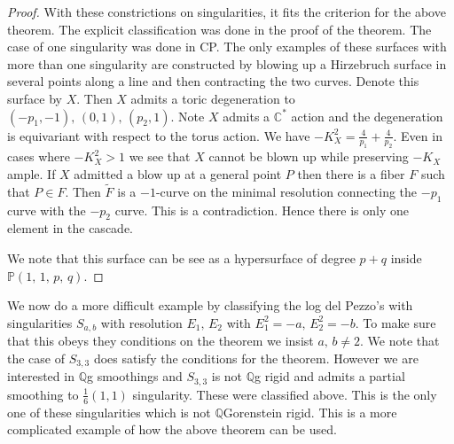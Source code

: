 \documentclass[11pt]{amsbook}
\theoremstyle{plain}
\newcommand{\ldp}{log del Pezzo}
\newcommand{\mb}[1]{\mathbb{#1}}
\begin{document}
\begin{proof}
With these constrictions on singularities, it fits the criterion for the above theorem. The explicit classification was done in the proof of the theorem. The case of one singularity was done in CP. The only examples of these surfaces with more than one singularity are constructed by blowing up a Hirzebruch surface in several points along a line and then contracting the two curves. Denote this surface by $X$. Then $X$ admits a toric degeneration to $(-p_1, -1), \, (0, 1), \, (p_2, 1)$. Note $X$ admits a $\mb{C}^*$ action and the degeneration is equivariant with respect to the torus action. We have $-K_X^2 = \frac{4}{p_1} + \frac{4}{p_2}$. Even in cases where $-K_X^2 > 1$ we see that $X$ cannot be blown up while preserving $-K_X$ ample. If $X$ admitted a blow up at a general point $P$ then there is a fiber $F$ such that $P \in F$. Then $\widetilde F$ is a $-1$-curve on the minimal resolution connecting the $-p_1$ curve with the $-p_2$ curve. This is a contradiction. Hence there is only one element in the cascade.



We note that this surface can be see as a hypersurface of degree $p+q$ inside $\mb{P}(1,\,1,\,p,\,q)$.

\end{proof}
We now do a more difficult example by classifying the \ldp's with singularities $S_{a,b}$ with resolution $E_1, \, E_2$ with $E_1^2 = -a,\, E_2^2 = -b$. To make sure that this obeys they conditions on the theorem we insist $a, \, b \neq 2$. We note that the case of $S_{3,3}$ does satisfy the conditions for the theorem. However we are interested in $\mb{Q}$g smoothings and $S_{3,3}$ is not $\mb{Q}$g rigid and admits a partial smoothing to $\frac{1}{6}(1,1)$ singularity. These were classified above. This is the only one of these singularities which is not $\mb{Q}$Gorenstein rigid. This is a more complicated example of how the above theorem can be used.
\end{document}
